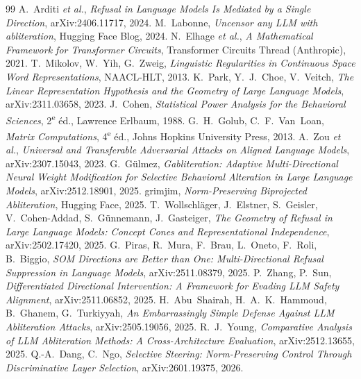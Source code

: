 \documentclass[11pt,a4paper]{article}
\theoremstyle{definition}
\theoremstyle{plain}
\begin{document}
\begin{thebibliography}{99}
 A.~Arditi \emph{et al.}, \emph{Refusal in Language Models Is
Mediated by a Single Direction}, arXiv:2406.11717, 2024.
 M.~Labonne, \emph{Uncensor any LLM with abliteration},
Hugging Face Blog, 2024.
 N.~Elhage \emph{et al.}, \emph{A Mathematical Framework for
Transformer Circuits}, Transformer Circuits Thread (Anthropic), 2021.
 T.~Mikolov, W.~Yih, G.~Zweig, \emph{Linguistic Regularities
in Continuous Space Word Representations}, NAACL-HLT, 2013.
 K.~Park, Y.~J.~Choe, V.~Veitch, \emph{The Linear Representation
Hypothesis and the Geometry of Large Language Models}, arXiv:2311.03658, 2023.
 J.~Cohen, \emph{Statistical Power Analysis for the Behavioral
Sciences}, 2\textsuperscript{e} éd., Lawrence Erlbaum, 1988.
 G.~H.~Golub, C.~F.~Van~Loan, \emph{Matrix Computations},
4\textsuperscript{e} éd., Johns Hopkins University Press, 2013.
 A.~Zou \emph{et al.}, \emph{Universal and Transferable Adversarial
Attacks on Aligned Language Models}, arXiv:2307.15043, 2023.
 G.~Gülmez, \emph{Gabliteration: Adaptive Multi-Directional
Neural Weight Modification for Selective Behavioral Alteration in Large Language
Models}, arXiv:2512.18901, 2025.
 grimjim, \emph{Norm-Preserving Biprojected Abliteration},
Hugging Face, 2025.
 T.~Wollschläger, J.~Elstner, S.~Geisler, V.~Cohen-Addad,
S.~Günnemann, J.~Gasteiger, \emph{The Geometry of Refusal in Large Language Models:
Concept Cones and Representational Independence}, arXiv:2502.17420, 2025.
 G.~Piras, R.~Mura, F.~Brau, L.~Oneto, F.~Roli, B.~Biggio,
\emph{SOM Directions are Better than One: Multi-Directional Refusal Suppression in
Language Models}, arXiv:2511.08379, 2025.
 P.~Zhang, P.~Sun, \emph{Differentiated Directional
Intervention: A Framework for Evading LLM Safety Alignment}, arXiv:2511.06852, 2025.
 H.~Abu~Shairah, H.~A.~K.~Hammoud, B.~Ghanem, G.~Turkiyyah,
\emph{An Embarrassingly Simple Defense Against LLM Abliteration Attacks},
arXiv:2505.19056, 2025.
 R.~J.~Young, \emph{Comparative Analysis of LLM Abliteration
Methods: A Cross-Architecture Evaluation}, arXiv:2512.13655, 2025.
 Q.-A.~Dang, C.~Ngo, \emph{Selective Steering: Norm-Preserving
Control Through Discriminative Layer Selection}, arXiv:2601.19375, 2026.
\end{thebibliography}
\end{document}
